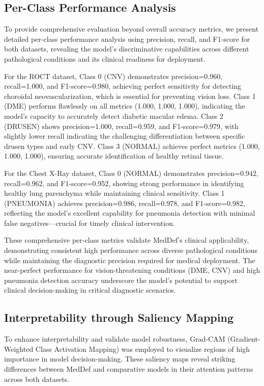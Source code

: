 \documentclass[preprint,12pt]{elsarticle}
\begin{document}
\subsection{Per-Class Performance Analysis}
To provide comprehensive evaluation beyond overall accuracy metrics, we present detailed per-class performance analysis using precision, recall, and F1-score for both datasets, revealing the model's discriminative capabilities across different pathological conditions and its clinical readiness for deployment.

For the ROCT dataset, Class 0 (CNV) demonstrates precision=0.960, recall=1.000, and F1-score=0.980, achieving perfect sensitivity for detecting choroidal neovascularization, which is essential for preventing vision loss. Class 1 (DME) performs flawlessly on all metrics (1.000, 1.000, 1.000), indicating the model's capacity to accurately detect diabetic macular edema. Class 2 (DRUSEN) shows precision=1.000, recall=0.959, and F1-score=0.979, with slightly lower recall indicating the challenging differentiation between specific drusen types and early CNV. Class 3 (NORMAL) achieves perfect metrics (1.000, 1.000, 1.000), ensuring accurate identification of healthy retinal tissue.

For the Chest X-Ray dataset, Class 0 (NORMAL) demonstrates precision=0.942, recall=0.962, and F1-score=0.952, showing strong performance in identifying healthy lung parenchyma while maintaining clinical sensitivity. Class 1 (PNEUMONIA) achieves precision=0.986, recall=0.978, and F1-score=0.982, reflecting the model's excellent capability for pneumonia detection with minimal false negatives—crucial for timely clinical intervention.

These comprehensive per-class metrics validate MedDef's clinical applicability, demonstrating consistent high performance across diverse pathological conditions while maintaining the diagnostic precision required for medical deployment. The near-perfect performance for vision-threatening conditions (DME, CNV) and high pneumonia detection accuracy underscore the model's potential to support clinical decision-making in critical diagnostic scenarios.

\subsection{Interpretability through Saliency Mapping}
To enhance interpretability and validate model robustness, Grad-CAM (Gradient-Weighted Class Activation Mapping) was employed to visualize regions of high importance in model decision-making. These saliency maps reveal striking differences between MedDef and comparative models in their attention patterns across both datasets.
\end{document}
